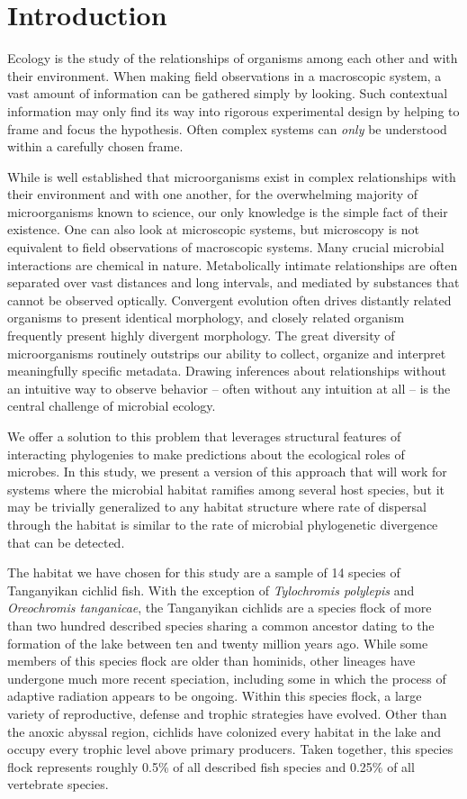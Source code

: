 \section{Introduction}

Ecology is the study of the relationships of organisms among each other and with their environment. When making field observations in a macroscopic system, a vast amount of information can be gathered simply by looking. Such contextual information may only find its way into rigorous experimental design by helping to frame and focus the hypothesis. Often complex systems can {\em only} be understood within a carefully chosen frame.

While is well established that microorganisms exist in complex relationships with their environment and with one another, for the overwhelming majority of microorganisms known to science, our only knowledge is the simple fact of their existence. One can also look at microscopic systems, but microscopy is not equivalent to field observations of macroscopic systems. Many crucial microbial interactions are chemical in nature. Metabolically intimate relationships are often separated over vast distances and long intervals, and mediated by substances that cannot be observed optically. Convergent evolution often drives distantly related organisms to present identical morphology, and closely related organism frequently present highly divergent morphology. The great diversity of microorganisms routinely outstrips our ability to collect, organize and interpret meaningfully specific metadata. Drawing inferences about relationships without an intuitive way to observe behavior -- often without any intuition at all -- is the central challenge of microbial ecology. 

We offer a solution to this problem that leverages structural features of interacting phylogenies to make predictions about the ecological roles of microbes. In this study, we present a version of this approach that will work for systems where the microbial habitat ramifies among several host species, but it may be trivially generalized to any habitat structure where rate of dispersal through the habitat is similar to the rate of microbial phylogenetic divergence that can be detected.

The habitat we have chosen for this study are a sample of 14 species of Tanganyikan cichlid fish. With the exception of {\em Tylochromis polylepis} and {\em Oreochromis tanganicae}, the Tanganyikan cichlids are a species flock of more than two hundred described species sharing a common ancestor dating to the formation of the lake between ten and twenty million years ago. While some members of this species flock are older than hominids, other lineages have undergone much more recent speciation, including some in which the process of adaptive radiation appears to be ongoing. Within this species flock, a large variety of reproductive, defense and trophic strategies have evolved. Other than the anoxic abyssal region, cichlids have colonized every habitat in the lake and occupy every trophic level above primary producers. Taken together, this species flock represents roughly 0.5\% of all described fish species and 0.25\% of all vertebrate species.

